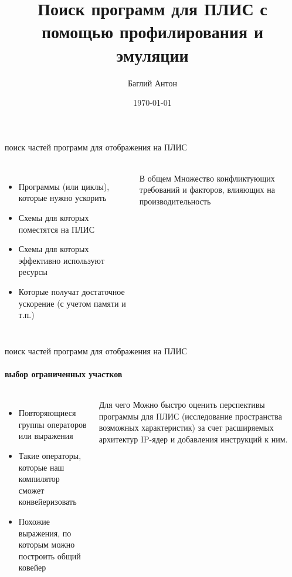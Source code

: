 \documentclass{beamer}              %
\title{Поиск программ для ПЛИС с помощью профилирования и эмуляции}
\subtitle{}
\date{\today}
\author{Баглий Антон}
\institute{\url{sfedu.ru}}
\begin{document}
\maketitle


\begin{frame}{поиск частей программ для отображения на ПЛИС}
  \framesubtitle{}
   
  \begin{columns}
      \begin{itemize}
        \item Программы (или циклы), которые нужно ускорить
        \item Схемы для которых поместятся на ПЛИС
        \item Схемы для которых эффективно используют ресурсы
        \item Которые получат достаточное ускорение (с учетом памяти и т.п.)
      \end{itemize}

      \begin{block}{В общем}
         Множество конфликтующих требований и факторов, влияющих на производительность
      \end{block}
  \end{columns}		  
\end{frame}

\begin{frame}{поиск частей программ для отображения на ПЛИС}
  \framesubtitle{выбор ограниченных участков}
   
  \begin{columns}
      \begin{itemize}
        \item Повторяющиеся группы операторов или выражения
        \item Такие операторы, которые наш компилятор сможет конвейеризовать
        \item Похожие выражения, по которым можно построить общий ковейер
      \end{itemize}

      \begin{block}{Для чего}
         Можно быстро оценить перспективы программы для ПЛИС (исследование пространства возможных характеристик) за счет расширяемых архитектур IP-ядер и добавления инструкций к ним.
      \end{block}
  \end{columns}		  
\end{frame}
\end{document}
